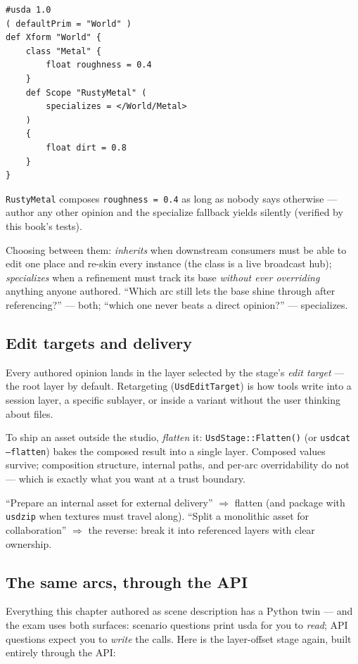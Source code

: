 \begin{lstlisting}
#usda 1.0
( defaultPrim = "World" )
def Xform "World" {
    class "Metal" {
        float roughness = 0.4
    }
    def Scope "RustyMetal" (
        specializes = </World/Metal>
    )
    {
        float dirt = 0.8
    }
}
\end{lstlisting}

\noindent\texttt{RustyMetal} composes \texttt{roughness = 0.4} as long as
nobody says otherwise --- author any other opinion and the specialize
fallback yields silently (verified by this book's tests).

\begin{ExamTip}
Choosing between them: \emph{inherits} when downstream consumers must be
able to edit one place and re-skin every instance (the class is a live
broadcast hub); \emph{specializes} when a refinement must track its base
\emph{without ever overriding} anything anyone authored. ``Which arc still
lets the base shine through after referencing?'' --- both; ``which one never
beats a direct opinion?'' --- specializes.
\end{ExamTip}

\subsection{Edit targets and delivery}\label{sec:c-edit}
Every authored opinion lands in the layer
selected by the stage's \emph{edit target} --- the root layer by default.
Retargeting (\texttt{UsdEditTarget}) is how tools write into a session layer,
a specific sublayer, or inside a variant without the user thinking about
files.

To ship an asset outside the studio, \emph{flatten} it:
\texttt{UsdStage::Flatten()} (or \texttt{usdcat --flatten}) bakes the composed
result into a single layer. Composed values survive; composition structure,
internal paths, and per-arc overridability do not --- which is exactly what
you want at a trust boundary.

\begin{ExamTip}
``Prepare an internal asset for external delivery'' $\Rightarrow$ flatten (and
package with \texttt{usdzip} when textures must travel along). ``Split a
monolithic asset for collaboration'' $\Rightarrow$ the reverse: break it into
referenced layers with clear ownership.
\end{ExamTip}

\subsection{The same arcs, through the API}\label{sec:c-api}
Everything this chapter authored as scene description has a Python twin ---
and the exam uses both surfaces: scenario questions print usda for you to
\emph{read}; API questions expect you to \emph{write} the calls. Here is the
layer-offset stage again, built entirely through the API:

